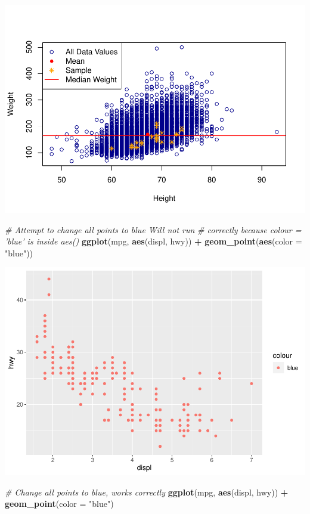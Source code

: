\documentclass[
]{book}
\newenvironment{Shaded}{\begin{snugshade}}{\end{snugshade}}
\newcommand{\CommentTok}[1]{\textcolor[rgb]{0.56,0.35,0.01}{\textit{#1}}}
\newcommand{\DataTypeTok}[1]{\textcolor[rgb]{0.13,0.29,0.53}{#1}}
\newcommand{\KeywordTok}[1]{\textcolor[rgb]{0.13,0.29,0.53}{\textbf{#1}}}
\newcommand{\NormalTok}[1]{#1}
\newcommand{\OperatorTok}[1]{\textcolor[rgb]{0.81,0.36,0.00}{\textbf{#1}}}
\newcommand{\StringTok}[1]{\textcolor[rgb]{0.31,0.60,0.02}{#1}}
\begin{document}
\includegraphics{_main_files/figure-latex/unnamed-chunk-253-1.pdf}

\begin{Shaded}
\begin{Highlighting}[]
\CommentTok{# Attempt to change all points to blue Will not run}
\CommentTok{# correctly because colour = 'blue' is inside aes()}
\KeywordTok{ggplot}\NormalTok{(mpg, }\KeywordTok{aes}\NormalTok{(displ, hwy)) }\OperatorTok{+}\StringTok{ }\KeywordTok{geom_point}\NormalTok{(}\KeywordTok{aes}\NormalTok{(}\DataTypeTok{color =} \StringTok{"blue"}\NormalTok{))}
\end{Highlighting}
\end{Shaded}

\includegraphics{_main_files/figure-latex/unnamed-chunk-253-2.pdf}

\begin{Shaded}
\begin{Highlighting}[]
\CommentTok{# Change all points to blue, works correctly}
\KeywordTok{ggplot}\NormalTok{(mpg, }\KeywordTok{aes}\NormalTok{(displ, hwy)) }\OperatorTok{+}\StringTok{ }\KeywordTok{geom_point}\NormalTok{(}\DataTypeTok{color =} \StringTok{"blue"}\NormalTok{)}
\end{Highlighting}
\end{Shaded}
\end{document}
